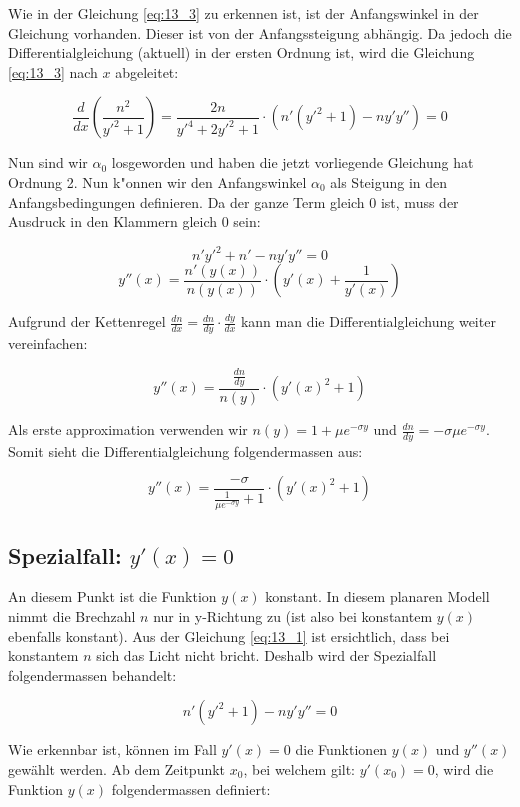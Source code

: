 Wie in der Gleichung \ref{eq:13_3} zu erkennen ist, ist der Anfangswinkel in der
Gleichung vorhanden. Dieser ist von der Anfangssteigung abhängig. Da jedoch die
Differentialgleichung (aktuell) in der ersten Ordnung ist, wird die Gleichung
\ref{eq:13_3} nach $x$ abgeleitet:

$$\frac{d}{dx} \left( \frac{n^2}{y'^2 + 1} \right) = \frac{2n}{y'^4 +
2y'^2 + 1} \cdot \left( n'(y'^2 + 1) - n y' y'' \right) = 0$$

Nun sind wir $\alpha_0$ losgeworden und haben die jetzt vorliegende Gleichung hat Ordnung
2. Nun k"onnen wir den Anfangswinkel $\alpha_0$ als Steigung in den Anfangsbedingungen
definieren. Da der ganze Term gleich 0 ist, muss der Ausdruck in den Klammern gleich 0
sein:

$$n'y'^2 + n' - n y' y'' = 0$$
$$y''(x) = \frac{n'(y(x))}{n(y(x))} \cdot \left( y'(x) + \frac{1}{y'(x)} \right)$$

Aufgrund der Kettenregel $\frac{dn}{dx} = \frac{dn}{dy} \cdot \frac{dy}{dx}$ kann man die
Differentialgleichung weiter vereinfachen:

\begin{equation} \label{eq:planar_DGL}
y''(x) = \frac{\frac{dn}{dy}}{n(y)} \cdot \left( y'(x)^2 + 1\right)
\end{equation}

Als erste approximation verwenden wir $n(y) = 1 + \mu e^{-\sigma y}$ und $\frac{dn}{dy} =
-\sigma \mu e^{-\sigma y}$.
Somit sieht die Differentialgleichung folgendermassen aus:

$$y''(x) = \frac{-\sigma}{\frac{1}{\mu e^{-\sigma y}} + 1} \cdot \left( y'(x)^2 + 1
\right)$$

\subsection{Spezialfall: $y'(x) = 0$} \label{ch:spezialfall}

An diesem Punkt ist die Funktion $y(x)$ konstant. In diesem planaren Modell nimmt die
Brechzahl $n$ nur in y-Richtung zu (ist also bei konstantem $y(x)$ ebenfalls konstant).
Aus der Gleichung \ref{eq:13_1} ist ersichtlich, dass bei konstantem $n$ sich das Licht
nicht bricht. Deshalb wird der Spezialfall folgendermassen behandelt:

$$n' (y'^2 + 1) - n y' y'' = 0$$

Wie erkennbar ist, können im Fall $y'(x) = 0$ die Funktionen $y(x)$ und $y''(x)$ gewählt
werden. Ab dem Zeitpunkt $x_0$, bei welchem gilt: $y'(x_0) = 0$, wird die Funktion $y(x)$
folgendermassen definiert:

